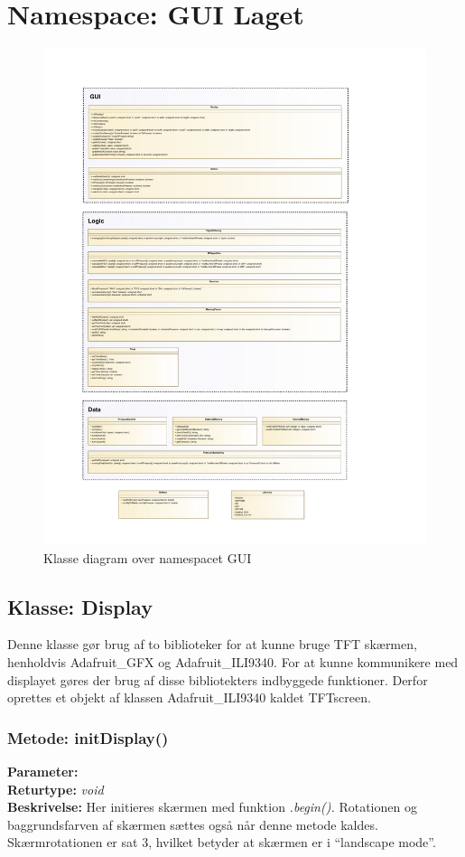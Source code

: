 \section{Namespace: GUI Laget}

\begin{figure}[H]
	\includegraphics[width=\textwidth]{klassediagram_GUI-crop.pdf}
	\caption{Klasse diagram over namespacet GUI}\label{fig:classDiagramGUI}
\end{figure}

\subsection{Klasse: Display}
Denne klasse gør brug af to biblioteker for at kunne bruge TFT skærmen, henholdvis Adafruit\_GFX og Adafruit\_ILI9340. For at kunne kommunikere med displayet gøres der brug af disse bibliotekters indbyggede funktioner. Derfor oprettes et objekt af klassen Adafruit\_ILI9340 kaldet TFTscreen.

\subsubsection{Metode: initDisplay()}
\textbf{Parameter: } 
\\ \textbf{Returtype: } \textit{void}
\\ \textbf{Beskrivelse: } Her initieres skærmen med funktion \textit{.begin().} Rotationen og baggrundsfarven af skærmen sættes også når denne metode kaldes. Skærmrotationen er sat 3, hvilket betyder at skærmen er i “landscape mode”. 

